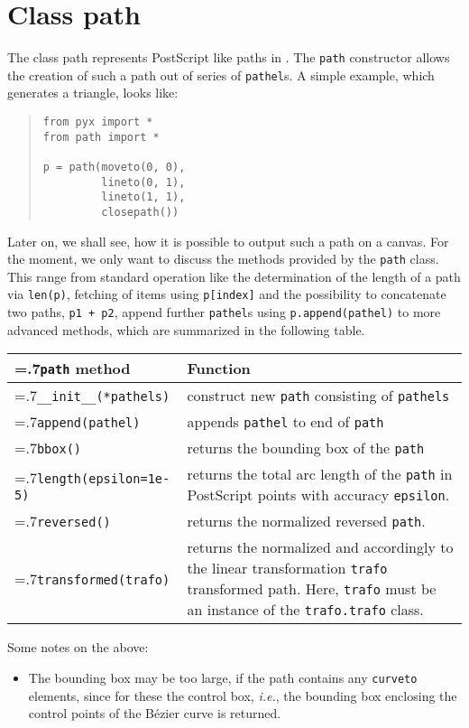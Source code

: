 \section{Class path}

The class path represents PostScript like paths in \PyX. The \verb|path| constructor allows the 
creation of such a path out of series of \verb|pathel|s. A simple example, which generates a triangle,
looks like:
\begin{quote}
\begin{verbatim}
from pyx import *
from path import *

p = path(moveto(0, 0), 
         lineto(0, 1),
         lineto(1, 1),
         closepath())
\end{verbatim}
\end{quote}
Later on, we shall see, how it is possible to output such a path on a
canvas. For the moment, we only want to discuss the methods provided
by the \verb|path| class. This range from standard operation like the
determination of the length of a path via \verb|len(p)|, fetching of
items using \verb|p[index]| and the possibility to concatenate two
paths, \verb|p1 + p2|, append further \verb|pathel|s using
\verb|p.append(pathel)| to more advanced methods, which are summarized
in the following table.

\medskip
\begin{tabularx}{\linewidth}{>{\hsize=.7\hsize}X>{\raggedright\arraybackslash\hsize=1.3\hsize}X}
  \texttt{path} method & Function \\
  \hline 
  \texttt{\_\_init\_\_(*pathels)} & construct new \texttt{path}
  consisting of \texttt{pathels}\\
  \texttt{append(pathel)} & appends \texttt{pathel} to end of \texttt{path}\\
  \texttt{bbox()} & returns the bounding box of the \texttt{path}\\
  \texttt{length(epsilon=1e-5)} & returns the total arc length of the \texttt{path} in
  PostScript points with accuracy \texttt{epsilon}. \\
  \texttt{reversed()} & returns the normalized reversed \texttt{path}.\\
  \texttt{transformed(trafo)} & returns the normalized and accordingly
  to the linear transformation \texttt{trafo} transformed path. Here,
  \texttt{trafo} must be an   instance of the \texttt{trafo.trafo} class.
\end{tabularx}
\medskip

Some notes on the above:
\begin{itemize}
\item The bounding box may be too large, if the path contains any
  \texttt{curveto} elements, since for these the control box,
  \textit{i.e.}, the bounding box enclosing the control points of
  the B\'ezier curve is returned.
\end{itemize}

